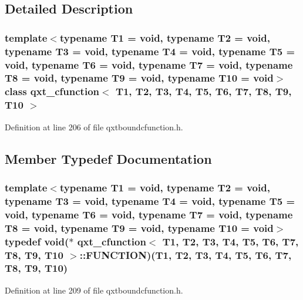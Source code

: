 \subsection{Detailed Description}
\subsubsection*{template$<$typename T1 = void, typename T2 = void, typename T3 = void, typename T4 = void, typename T5 = void, typename T6 = void, typename T7 = void, typename T8 = void, typename T9 = void, typename T10 = void$>$class qxt\-\_\-cfunction$<$ T1, T2, T3, T4, T5, T6, T7, T8, T9, T10 $>$}



Definition at line 206 of file qxtboundcfunction.\-h.



\subsection{Member Typedef Documentation}
\hypertarget{classqxt__cfunction_a0bed98a1ad1da8e4bcb5d224c8b41fab}{
\subsubsection[{F\-U\-N\-C\-T\-I\-O\-N}]{\setlength{\rightskip}{0pt plus 5cm}template$<$typename T1  = void, typename T2  = void, typename T3  = void, typename T4  = void, typename T5  = void, typename T6  = void, typename T7  = void, typename T8  = void, typename T9  = void, typename T10  = void$>$ typedef {\bf void}($\ast$ {\bf qxt\-\_\-cfunction}$<$ T1, T2, T3, T4, T5, T6, T7, T8, T9, T10 $>$\-::F\-U\-N\-C\-T\-I\-O\-N)(T1, T2, T3, T4, T5, T6, T7, T8, T9, T10)}}\label{classqxt__cfunction_a0bed98a1ad1da8e4bcb5d224c8b41fab}


Definition at line 209 of file qxtboundcfunction.\-h.



